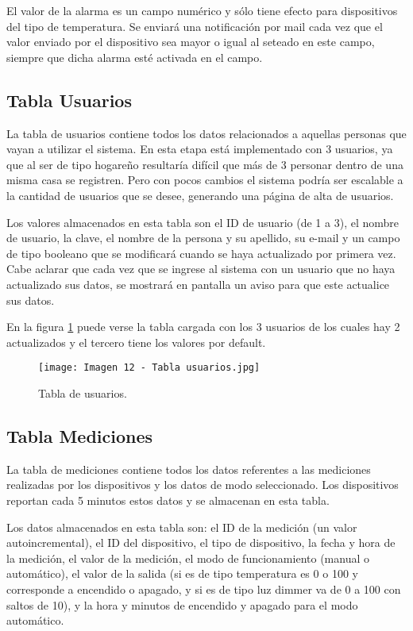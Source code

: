 El valor de la alarma es un campo numérico y sólo tiene efecto para dispositivos del tipo de temperatura. Se enviará una notificación por mail cada vez que el valor enviado por el dispositivo sea mayor o igual al seteado en este campo, siempre que dicha alarma esté activada en el campo.

\subsection{Tabla Usuarios}

La tabla de usuarios contiene todos los datos relacionados a aquellas personas que vayan a utilizar el sistema. En esta etapa está implementado con 3 usuarios, ya que al ser de tipo hogareño resultaría difícil que más de 3 personar dentro de una misma casa se registren. Pero con pocos cambios el sistema podría ser escalable a la cantidad de usuarios que se desee, generando una página de alta de usuarios.

Los valores almacenados en esta tabla son el ID de usuario (de 1 a 3), el nombre de usuario, la clave, el nombre de la persona y su apellido, su e-mail y un campo de tipo booleano que se modificará cuando se haya actualizado por primera vez. Cabe aclarar que cada vez que se ingrese al sistema con un usuario que no haya actualizado sus datos, se mostrará en pantalla un aviso para que este actualice sus datos.

En la figura \ref{fig:12} puede verse la tabla cargada con los 3 usuarios de los cuales hay 2 actualizados y el tercero tiene los valores por default.

\begin{figure}[h]
\centering
\texttt{[image: Imagen 12 - Tabla usuarios.jpg]}
\caption[Tabla usuarios]{Tabla de usuarios. \footnotemark}
\label{fig:12}
\end{figure}

\subsection{Tabla Mediciones}

La tabla de mediciones contiene todos los datos referentes a las mediciones realizadas por los dispositivos y los datos de modo seleccionado. Los dispositivos reportan cada 5 minutos estos datos y se almacenan en esta tabla.

Los datos almacenados en esta tabla son: el ID de la medición (un valor autoincremental), el ID del dispositivo, el tipo de dispositivo, la fecha y hora de la medición, el valor de la medición, el modo de funcionamiento (manual o automático), el valor de la salida (si es de tipo temperatura es 0 o 100 y corresponde a encendido o apagado, y si es de tipo luz dimmer va de 0 a 100 con saltos de 10), y la hora y minutos de encendido y apagado para el modo automático.

